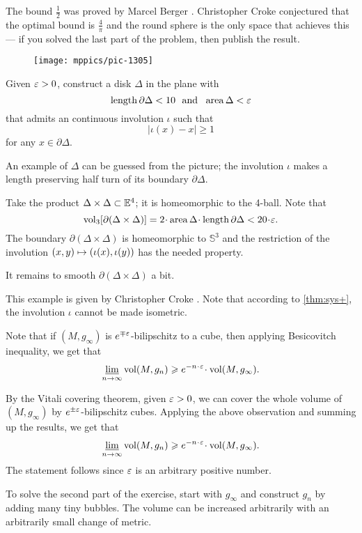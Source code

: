 The bound $\tfrac12$ was proved by Marcel Berger \cite{berger}. 
Christopher Croke conjectured that the optimal bound is $\tfrac4\pi$ and the round sphere is the only space that achieves this \cite[Conjecture 0.3 in][]{croke} --- if you solved the last part of the problem, then publish the result.

\begin{wrapfigure}{r}{20 mm}
\vskip-0mm
\centering
\texttt{[image: mppics/pic-1305]}
\end{wrapfigure}

Given $\varepsilon>0$, construct a disk $\Delta$ in the plane with 
\[\mathop{\rm length}\nolimits\partial \Delta<10\ \ \text{and}\ \ \operatorname{\rm area}\nolimits \Delta<\varepsilon\]
that admits an continuous involution $\iota$ such that 
\[|\iota(x)-x|\ge 1\]
for any $x\in\partial \Delta$.

An example of $\Delta$ can be guessed from the picture;
the involution $\iota$ makes a length preserving half turn of its boundary $\partial \Delta$.


Take the product $\Delta\times \Delta\subset \mathbb{E}^4$;
it is homeomorphic to the 4-ball.
Note that 
$$\vol_3[\partial(\Delta\times \Delta)]=2\cdot\area \Delta\cdot\length \partial \Delta<20\cdot\eps.$$
The boundary $\partial(\Delta\times \Delta)$ is homeomorphic to $\mathbb{S}^3$
and the restriction of the involution $(x,y)\z\mapsto (\iota(x),\iota(y))$ has the needed property.

It remains to smooth $\partial(\Delta\times \Delta)$ a  bit.

 This example is given by Christopher Croke \cite{croke}.
Note that according to \ref{thm:sys+}, 
the involution $\iota$ cannot be made isometric.

Note that if $(M,g_\infty)$ is $e^{\mp\varepsilon}$-bilipschitz to a cube, then applying Besicovitch inequality, we get that 
\[\liminf_{n\to\infty} \vol (M,g_n)\ge e^{-n\cdot \eps}\cdot\vol (M,g_\infty).\]

By the Vitali covering theorem, given $\varepsilon>0$, we can cover the whole volume of $(M,g_\infty)$ by $e^{\pm\varepsilon}$-bilipschitz cubes.
Applying the above observation and summing up the results, we get that 
\[\liminf_{n\to\infty} \vol (M,g_n)\ge e^{-n\cdot \eps}\cdot\vol (M,g_\infty).\]
The statement follows since $\varepsilon$ is an arbitrary positive number.

To solve the second part of the exercise, start with $g_\infty$ and construct $g_n$ by  adding many tiny bubbles.
The volume can be increased arbitrarily with an arbitrarily small change of metric.

